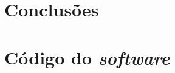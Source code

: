 \documentclass[a4paper, 12 pt]{article} %
\begin{document}
\blindtext 
%
\blindtext 
%
\blindtext

\clearpage


\section{Conclusões}

\blindtext 
%
\blindtext 
%
\blindtext


\clearpage






\clearpage


\appendix
\section{Código do \emph{software}}
\label{apendice_scr}
\end{document}
